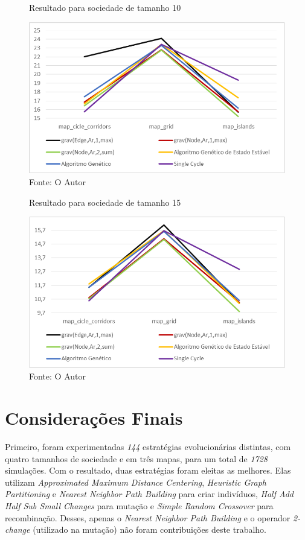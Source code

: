 \begin{figure}
	\caption[Resultado para sociedade de tamanho 10]{Resultado para sociedade 
		de tamanho 10}
	\centering
	\includegraphics[width=\columnwidth]{images/graph_agent3.png}
	\caption*{Fonte: O Autor}
	\label{fig:graph_agentes3}
\end{figure}

\begin{figure}
	\caption[Resultado para sociedade de tamanho 15]{Resultado para sociedade 
		de tamanho 15}
	\centering
	\includegraphics[width=\columnwidth]{images/graph_agent4.png}
	\caption*{Fonte: O Autor}
	\label{fig:graph_agentes4}
\end{figure}

\section{Considerações Finais}

Primeiro, foram experimentadas \textit{144} estratégias evolucionárias 
distintas, com quatro tamanhos de sociedade e em três mapas, para um total de 
\textit{1728} simulações. Com o resultado, duas estratégias foram eleitas as 
melhores. Elas utilizam \textit{Approximated Maximum Distance Centering}, 
\textit{Heuristic Graph Partitioning} e \textit{Nearest Neighbor Path Building} 
para criar indivíduos, \textit{Half Add Half Sub Small Changes} para mutação e 
\textit{Simple Random Crossover} para recombinação. Desses, apenas o 
\textit{Nearest Neighbor Path Building} e o operador \textit{2-change} 
(utilizado na mutação) não foram contribuições deste trabalho.

